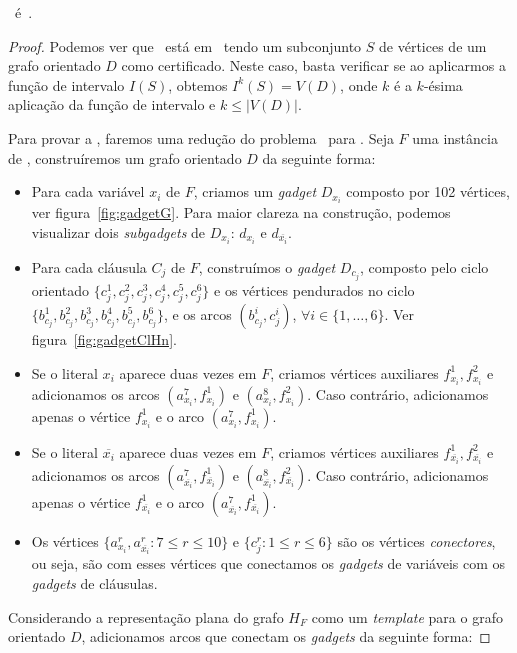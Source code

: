 \begin{theorem}
    \hnd~é~\npc.
    \begin{proof}
    Podemos ver que \hnd~está em \np~tendo um subconjunto $S$ de vértices de um grafo orientado $D$ como certificado. Neste caso, basta verificar se ao aplicarmos a função de intervalo $I(S)$, obtemos $I^k(S) = V(D)$, onde $k$ é a $k$-ésima aplicação da função de intervalo e $k \leq |V(D)|$.

    Para provar a \npct, faremos uma redução do problema \sam~para \hnd. Seja $F$ uma instância de \sam, construíremos um grafo orientado $D$ da seguinte forma:

    \begin{itemize}
        \item Para cada variável $x_i$ de $F$, criamos um \emph{gadget} $D_{x_i}$ composto por 102 vértices, ver figura~\ref{fig:gadgetG}. Para maior clareza na construção, podemos visualizar dois \emph{subgadgets} de $D_{x_i}$: $d_{x_i}$ e $d_{\overline{x_i}}$.
        \item Para cada cláusula $C_j$ de $F$, construímos o \emph{gadget} $D_{c_j}$, composto pelo ciclo orientado $\{c_j^1, c_j^2, c_j^3, c_j^4, c_j^5, c_j^6\}$ e os vértices pendurados no ciclo $\{b_{c_j}^1, b_{c_j}^2, b_{c_j}^3, b_{c_j}^4, b_{c_j}^5, b_{c_j}^6\}$, e os arcos $(b_{c_j}^i, c_j^i)$, $\forall i \in \{1, \ldots, 6\}$. Ver figura~\ref{fig:gadgetClHn}.
        \item Se o literal $x_i$ aparece duas vezes em $F$, criamos vértices auxiliares $f_{x_i}^1, f_{x_i}^2$ e adicionamos os arcos $(a_{x_i}^7, f_{x_i}^1)$ e $(a_{x_i}^8, f_{x_i}^2)$. Caso contrário, adicionamos apenas o vértice $f_{x_i}^1$ e o arco $(a_{x_i}^7, f_{x_i}^1)$.
        \item Se o literal $\overline{x_i}$ aparece duas vezes em $F$, criamos vértices auxiliares $f_{\overline{x_i}}^1, f_{\overline{x_i}}^2$ e adicionamos os arcos $(a_{\overline{x_i}}^7, f_{\overline{x_i}}^1)$ e $(a_{\overline{x_i}}^8, f_{\overline{x_i}}^2)$. Caso contrário, adicionamos apenas o vértice $f_{\overline{x_i}}^1$ e o arco $(a_{\overline{x_i}}^7, f_{\overline{x_i}}^1)$.
        \item Os vértices $\{a_{x_i}^r, a_{\overline{x_i}}^r : 7 \leq r \leq 10\}$ e $\{c_j^r:1 \leq r \leq 6\}$ são os vértices \emph{conectores}, ou seja, são com esses vértices que conectamos os \emph{gadgets} de variáveis com os \emph{gadgets} de cláusulas.
    \end{itemize}

    Considerando a representação plana do grafo $H_F$ como um \emph{template} para o grafo orientado $D$, adicionamos arcos que conectam os \emph{gadgets} da seguinte forma:


\end{proof}
\end{theorem}
